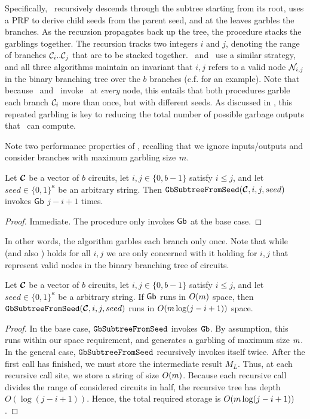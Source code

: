 Specifically, \gbtree\ recursively descends through the
subtree starting from its root, uses a PRF to derive child seeds from the parent seed, and at the
leaves garbles the branches.
As the recursion propagates back up the tree, the procedure stacks the
garblings together.
%
The recursion tracks two integers $i$ and
$j$, denoting the range of branches $\mathcal C_i..\mathcal C_j$ that are to
be stacked together.
\evcond\ and \gbcond\ use a similar strategy, and all three algorithms
maintain an invariant that $i,j$ refers to a valid node $\mathtt{\cal N}_{i,j}$ in the binary
branching tree over the $b$ branches (c.f.  for an
example).
%
Note that because \evcond\ and \gbcond\ invoke \gbtree\ at
\emph{every} node, this entails that both procedures garble
each branch $\mathcal C_i$ more than once, but with different seeds.
As discussed in , this repeated garbling is key
to reducing the total number of possible garbage outputs that \E\
can compute.


Note two performance properties of \gbtree, recalling that we ignore
inputs/outputs and consider branches with maximum
garbling size $m$.
\begin{lemma}\label{lemma:gbtreetime}
  Let $\vec{\cir}$ be a vector of $b$ circuits,
  let $i, j \in \{0, b-1\}$ satisfy $i \leq j$,
  and let $seed \in \{0, 1\}^\kappa$ be an arbitrary string.
  Then $\gbtree(\vec \cir, i, j, seed)$ invokes $\textsf{Gb}$ $j - i + 1$ times.
\end{lemma}
\begin{proof}
  Immediate. The procedure only invokes $\textsf{Gb}$ at the base case.
\end{proof}
In other words, the algorithm garbles each branch only once.
Note that while  (and also
) holds for all $i, j$ we are
only concerned with it holding for $i, j$ that represent valid nodes
in the binary branching tree of circuits.


\begin{lemma}\label{lemma:gbtreespace}
  Let $\vec{\cir}$ be a vector of $b$ circuits,
  let $i, j \in \{0, b-1\}$ satisfy $i \leq j$,
  and let $seed \in \{0, 1\}^\kappa$ be a arbitrary string.
  If $\mathsf{Gb}$ runs in $O(m)$ space,
  then $\gbtree(\vec \cir, i, j, seed)$ runs in $O(m \log (j-i+1))$ space.
\end{lemma}
\begin{proof}
  In the base case, $\mathtt{GbSubtreeFromSeed}$ invokes $\mathtt{Gb}$. By assumption, this runs
  within our space requirement, and generates a garbling of maximum
  size $m$.
  In the general case, $\mathtt{GbSubtreeFromSeed}$ recursively invokes itself twice.
  After the first call has finished, we must store the
  intermediate result $M_L$.
  Thus, at each recursive call site, we store a string of size
  $O(m)$.
  Because each recursive call divides the range of considered circuits
  in half, the recursive tree has depth $O(\log(j-i+1))$.
  Hence, the total required storage is $O(m \log(j-i+1))$.
\end{proof}

